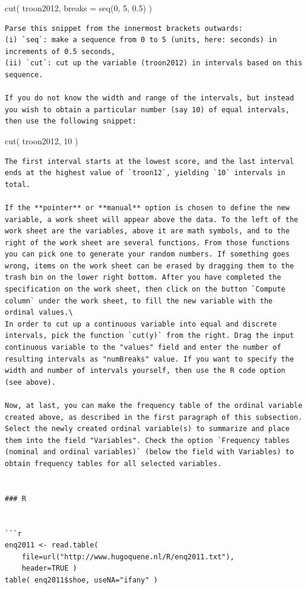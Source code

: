 \documentclass[
]{book}
\begin{document}
cut( troon2012, breaks = seq(0, 5, 0.5) )

\begin{verbatim}
Parse this snippet from the innermost brackets outwards:
(i) `seq`: make a sequence from 0 to 5 (units, here: seconds) in increments of 0.5 seconds, 
(ii) `cut`: cut up the variable (troon2012) in intervals based on this sequence. 

If you do not know the width and range of the intervals, but instead you wish to obtain a particular number (say 10) of equal intervals, then use the following snippet: 
\end{verbatim}

cut( troon2012, 10 )

\begin{verbatim}
The first interval starts at the lowest score, and the last interval ends at the highest value of `troon12`, yielding `10` intervals in total.  

If the **pointer** or **manual** option is chosen to define the new variable, a work sheet will appear above the data. To the left of the work sheet are the variables, above it are math symbols, and to the right of the work sheet are several functions. From those functions you can pick one to generate your random numbers. If something goes wrong, items on the work sheet can be erased by dragging them to the trash bin on the lower right bottom. After you have completed the specification on the work sheet, then click on the button `Compute column` under the work sheet, to fill the new variable with the ordinal values.\
In order to cut up a continuous variable into equal and discrete intervals, pick the function `cut(y)` from the right. Drag the input continuous variable to the "values" field and enter the number of resulting intervals as "numBreaks" value. If you want to specify the width and number of intervals yourself, then use the R code option (see above). 

Now, at last, you can make the frequency table of the ordinal variable created above, as described in the first paragraph of this subsection. Select the newly created ordinal variable(s) to summarize and place them into the field "Variables". Check the option `Frequency tables (nominal and ordinal variables)` (below the field with Variables) to obtain frequency tables for all selected variables. 


### R


```r
enq2011 <- read.table( 
    file=url("http://www.hugoquene.nl/R/enq2011.txt"), 
    header=TRUE )
table( enq2011$shoe, useNA="ifany" ) 
\end{verbatim}
\end{document}
